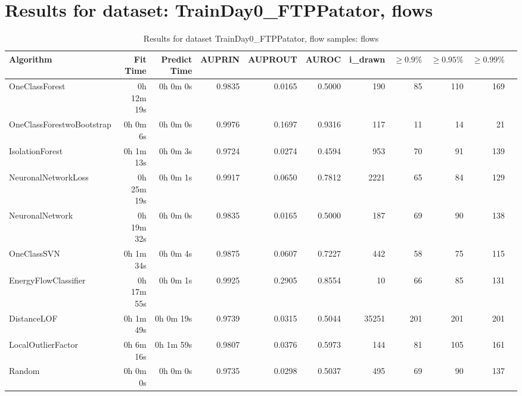 \documentclass{article}
\begin{document}
\section*{Results for dataset: TrainDay0_FTPPatator, flows}
\begin{table}[h!]
\centering
\caption{Results for dataset TrainDay0_FTPPatator, flow samples: flows}
\begin{tabular}{lrrrrrrrrrr}
\toprule
Algorithm & Fit Time & Predict Time & AUPRIN & AUPROUT & AUROC & i\_drawn & $\geq 0.9\%$ & $\geq 0.95\%$ & $\geq 0.99\%$ \\
\midrule
OneClassForest & 0h 12m 19s & 0h 0m 0s & 0.9835 & 0.0165 & 0.5000 & 190 & 85 & 110 & 169 \\
OneClassForestwoBootstrap & 0h 0m 6s & 0h 0m 0s & 0.9976 & 0.1697 & 0.9316 & 117 & 11 & 14 & 21 \\
IsolationForest & 0h 1m 13s & 0h 0m 3s & 0.9724 & 0.0274 & 0.4594 & 953 & 70 & 91 & 139 \\
NeuronalNetworkLoss & 0h 25m 19s & 0h 0m 1s & 0.9917 & 0.0650 & 0.7812 & 2221 & 65 & 84 & 129 \\
NeuronalNetwork & 0h 19m 32s & 0h 0m 0s & 0.9835 & 0.0165 & 0.5000 & 187 & 69 & 90 & 138 \\
OneClassSVN & 0h 1m 34s & 0h 0m 4s & 0.9875 & 0.0607 & 0.7227 & 442 & 58 & 75 & 115 \\
EnergyFlowClassifier & 0h 17m 55s & 0h 0m 1s & 0.9925 & 0.2905 & 0.8554 & 10 & 66 & 85 & 131 \\
DistanceLOF & 0h 1m 49s & 0h 0m 19s & 0.9739 & 0.0315 & 0.5044 & 35251 & 201 & 201 & 201 \\
LocalOutlierFactor & 0h 6m 16s & 0h 1m 59s & 0.9807 & 0.0376 & 0.5973 & 144 & 81 & 105 & 161 \\
Random & 0h 0m 0s & 0h 0m 0s & 0.9735 & 0.0298 & 0.5037 & 495 & 69 & 90 & 137 \\
\bottomrule
\end{tabular}
\end{table}
\end{document}
